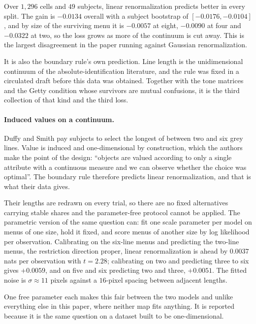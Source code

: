 \documentclass[11pt]{article}
\begin{document}
Over $1{,}296$ cells and $49$ subjects, linear renormalization predicts better in every split.
The gain is $-0.0134$ overall with a subject bootstrap of $[-0.0176, -0.0104]$, and by size of
the surviving menu it is $-0.0057$ at eight, $-0.0090$ at four and $-0.0322$ at two, so the
loss grows as more of the continuum is cut away. This is the largest disagreement in the paper
running against Gaussian renormalization.

It is also the boundary rule's own prediction. Line length is the unidimensional continuum of
the absolute-identification literature, and the rule was fixed in a circulated draft before
this data was obtained. Together with the tone matrices and the Getty condition whose survivors
are mutual confusions, it is the third collection of that kind and the third loss.

\paragraph{Induced values on a continuum.} Duffy and Smith \cite{duffysmith2025} pay subjects
to select the longest of between two and six grey lines. Value is induced and one-dimensional by
construction, which the authors make the point of the design: ``objects are valued according to
only a single attribute with a continuous measure and we can observe whether the choice was
optimal''. The boundary rule therefore predicts linear renormalization, and that is what their
data gives.

Their lengths are redrawn on every trial, so there are no fixed alternatives carrying stable
shares and the parameter-free protocol cannot be applied. The parametric version of the same
question can: fit one scale parameter per model on menus of one size, hold it fixed, and score
menus of another size by log likelihood per observation. Calibrating on the six-line menus and
predicting the two-line menus, the restriction direction proper, linear renormalization is ahead
by $0.0037$ nats per observation with $t = 2.28$; calibrating on two and predicting three to six
gives $+0.0059$, and on five and six predicting two and three, $+0.0051$. The fitted noise is
$\sigma \approx 11$ pixels against a $16$-pixel spacing between adjacent lengths.

One free parameter each makes this fair between the two models and unlike everything else in
this paper, where neither map fits anything. It is reported because it is the same question on a
dataset built to be one-dimensional.
\end{document}
